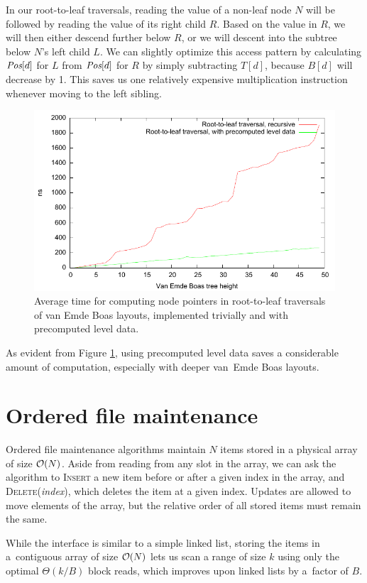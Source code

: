 In our root-to-leaf traversals, reading the value of a non-leaf node $N$ will be
followed by reading the value of its right child $R$. Based on the value in
$R$, we will then either descend further below $R$, or we will descent into
the subtree below $N$'s left child $L$.
We can slightly optimize this access pattern by calculating $\hbox{\it Pos}[d]$
for $L$ from $\hbox{\it Pos}[d]$ for $R$ by simply subtracting $T[d]$, because
$B[d]$ will decrease by 1. This saves us one relatively expensive multiplication
instruction whenever moving to the left sibling.

\begin{figure}
\centering
\includegraphics{img/veb-drilldown-speed}
\caption{Average time for computing node pointers in root-to-leaf traversals
	of van Emde Boas layouts, implemented trivially and with precomputed
	level data.}
\label{fig:veb_drilldown_speed}
\end{figure}
As evident from Figure \ref{fig:veb_drilldown_speed}, using precomputed level
data saves a considerable amount of computation, especially with deeper
van~Emde Boas layouts.

\section{Ordered file maintenance}
Ordered file maintenance algorithms maintain $N$ items stored in a physical
array of size $\mathcal{O}(N)$. Aside from reading from any slot in the array,
we can ask the algorithm to \textsc{Insert} a new item before or after
a given index in the array, and \textsc{Delete}(\emph{index}), which deletes
the item at a given index. Updates are allowed to move elements of the array,
but the relative order of all stored items must remain the same.

While the interface is similar to a simple linked list, storing the items
in a~contiguous array of size $\mathcal{O}(N)$ lets us scan a range of size $k$ using
only the optimal $\Theta(k/B)$ block reads, which improves upon linked lists
by a~factor of $B$.

